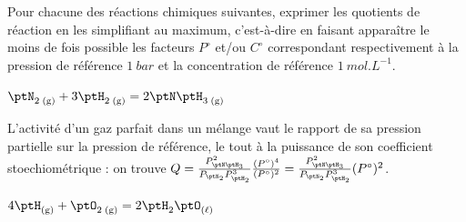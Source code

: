 \hauteurLargeurCadreReponse		{8mm}{6cm}
\initialisationEntrainement

Pour chacune des réactions chimiques suivantes, exprimer les quotients de réaction en les simplifiant au maximum, c'est-à-dire en faisant apparaître le moins de fois possible les facteurs $P^{\circ}$ et/ou $C^\circ$ correspondant respectivement à la pression de référence $\SI{1}{bar}$ 
et la concentration de référence $\SI{1}{mol.L^{-1}}$.

\debutEntrainement


\begin{enonce}
$\ptN_{2 \; \mathrm{(g)}} + 3 \ptH_{2 \; \mathrm{(g)}} = 2 \ptN\ptH_{3 \; \mathrm{(g)}}$
\end{enonce}


\begin{corrige}
L'activité d'un gaz parfait dans un mélange vaut le rapport de sa pression partielle sur la pression de référence, le tout à la puissance de son coefficient stoechiométrique : on trouve $Q=\frac{P_{{\ptN\ptH_3}}^2 }{P_{\ptN_2} P_{{\ptH_2}}^3} \frac{(P^{\circ})^4}{(P^{\circ})^2 }=\frac{P_{{\ptN\ptH_3}}^2 }{P_{\ptN_2} P_{{\ptH_2}}^3} (P^{\circ})^2$.
\end{corrige}



\begin{enonce}
$4\ptH_{\mathrm{(g)}} +  \ptO_{2 \; \mathrm{(g)}} = 2 \ptH_2\ptO_{\mathrm{(\ell)}}$
\end{enonce}


